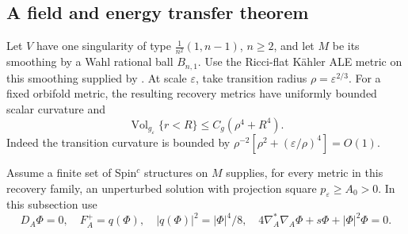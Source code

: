 \documentclass[11pt,a4paper]{article}
\theoremstyle{definition}\newtheorem{definition}[theorem]{Definition}
\theoremstyle{remark}\newtheorem{remark}[theorem]{Remark}
\newcommand{\Vol}{\operatorname{Vol}}
\newcommand{\eps}{\varepsilon}
\begin{document}
\subsection{A field and energy transfer theorem}
Let $V$ have one singularity of type $\frac1{n^2}(1,n-1)$, $n\ge2$, and let $M$ be its smoothing by a Wahl rational ball $B_{n,1}$. Use the Ricci-flat Kähler ALE metric on this smoothing supplied by \cite{Suvaina}. At scale $\eps$, take transition radius $\rho=\eps^{2/3}$. For a fixed orbifold metric, the resulting recovery metrics have uniformly bounded scalar curvature and
\[
 \Vol_{g_\eps}\{r<R\}\le C_g(\rho^4+R^4).
\]
Indeed the transition curvature is bounded by
$\rho^{-2}[\rho^2+(\eps/\rho)^4]=O(1)$.

Assume a finite set of Spin$^c$ structures on $M$ supplies, for every metric in this recovery family, an unperturbed solution with projection square $p_\eps\ge A_0>0$. In this subsection use
\begin{equation}\label{eq:WahlSW}
 D_A\Phi=0,\quad F_A^+=q(\Phi),\quad |q(\Phi)|^2=|\Phi|^4/8,
 \quad4\nabla_A^*\nabla_A\Phi+s\Phi+|\Phi|^2\Phi=0.
\end{equation}
\end{document}
